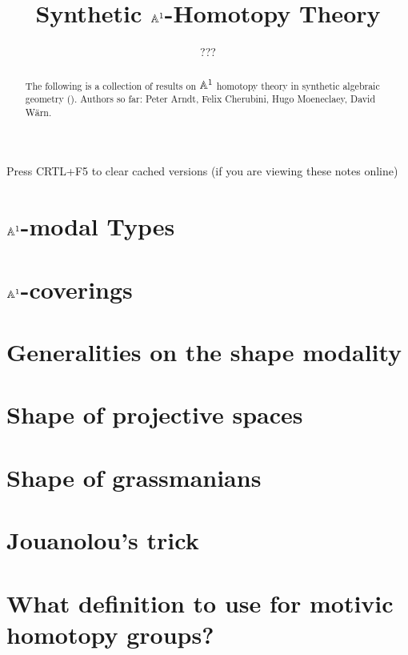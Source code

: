 \documentclass{../util/zariski}
\title{Synthetic $\mathbb{A}^1$-Homotopy Theory}
\author{???}
\begin{document}
\maketitle

\begin{center}
  \color{purple}
  \large{Press CRTL+F5 to clear cached versions}
  \large{(if you are viewing these notes online)}
\end{center}

\begin{abstract}
  The following is a collection of results on $\mathbb{A}^1$ homotopy theory in synthetic algebraic geometry (\cite{draft}).
  Authors so far: Peter Arndt, Felix Cherubini, Hugo Moeneclaey, David Wärn. 
\end{abstract}

\tableofcontents

\section[A1-modal types]{$\mathbb{A}^1$-modal Types}


%

\section{$\mathbb{A}^1$-coverings}


\section{Generalities on the shape modality}


\section{Shape of projective spaces}


\section{Shape of grassmanians}


\section{Jouanolou's trick}


\section{What definition to use for motivic homotopy groups?}


\printindex

\printbibliography
\end{document}
